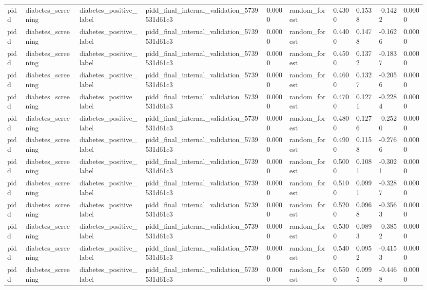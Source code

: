 \begin{tabular}{llllllllll}
pidd & diabetes\_screening & diabetes\_positive\_label & pidd\_final\_internal\_validation\_5739531d61c3 & 0.0000 & random\_forest & 0.4300 & 0.1538 & -0.1422 & 0.0000 \\
pidd & diabetes\_screening & diabetes\_positive\_label & pidd\_final\_internal\_validation\_5739531d61c3 & 0.0000 & random\_forest & 0.4400 & 0.1478 & -0.1626 & 0.0000 \\
pidd & diabetes\_screening & diabetes\_positive\_label & pidd\_final\_internal\_validation\_5739531d61c3 & 0.0000 & random\_forest & 0.4500 & 0.1372 & -0.1837 & 0.0000 \\
pidd & diabetes\_screening & diabetes\_positive\_label & pidd\_final\_internal\_validation\_5739531d61c3 & 0.0000 & random\_forest & 0.4600 & 0.1327 & -0.2056 & 0.0000 \\
pidd & diabetes\_screening & diabetes\_positive\_label & pidd\_final\_internal\_validation\_5739531d61c3 & 0.0000 & random\_forest & 0.4700 & 0.1271 & -0.2284 & 0.0000 \\
pidd & diabetes\_screening & diabetes\_positive\_label & pidd\_final\_internal\_validation\_5739531d61c3 & 0.0000 & random\_forest & 0.4800 & 0.1276 & -0.2520 & 0.0000 \\
pidd & diabetes\_screening & diabetes\_positive\_label & pidd\_final\_internal\_validation\_5739531d61c3 & 0.0000 & random\_forest & 0.4900 & 0.1158 & -0.2766 & 0.0000 \\
pidd & diabetes\_screening & diabetes\_positive\_label & pidd\_final\_internal\_validation\_5739531d61c3 & 0.0000 & random\_forest & 0.5000 & 0.1081 & -0.3021 & 0.0000 \\
pidd & diabetes\_screening & diabetes\_positive\_label & pidd\_final\_internal\_validation\_5739531d61c3 & 0.0000 & random\_forest & 0.5100 & 0.0991 & -0.3287 & 0.0000 \\
pidd & diabetes\_screening & diabetes\_positive\_label & pidd\_final\_internal\_validation\_5739531d61c3 & 0.0000 & random\_forest & 0.5200 & 0.0968 & -0.3563 & 0.0000 \\
pidd & diabetes\_screening & diabetes\_positive\_label & pidd\_final\_internal\_validation\_5739531d61c3 & 0.0000 & random\_forest & 0.5300 & 0.0893 & -0.3852 & 0.0000 \\
pidd & diabetes\_screening & diabetes\_positive\_label & pidd\_final\_internal\_validation\_5739531d61c3 & 0.0000 & random\_forest & 0.5400 & 0.0952 & -0.4153 & 0.0000 \\
pidd & diabetes\_screening & diabetes\_positive\_label & pidd\_final\_internal\_validation\_5739531d61c3 & 0.0000 & random\_forest & 0.5500 & 0.0995 & -0.4468 & 0.0000 \\

\end{tabular}
